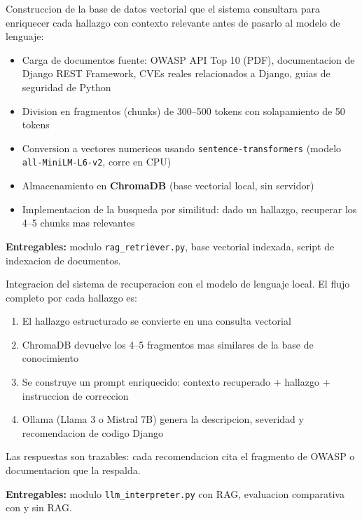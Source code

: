 \documentclass[12pt, a4paper]{article}
\begin{document}
\begin{tealbox}[title={Fase 5 --- Base de conocimiento RAG}]
Construccion de la base de datos vectorial que el sistema consultara para enriquecer cada hallazgo con contexto relevante antes de pasarlo al modelo de lenguaje:

\begin{itemize}[leftmargin=1.5em, itemsep=2pt]
  \item Carga de documentos fuente: OWASP API Top 10 (PDF), documentacion de Django REST Framework, CVEs reales relacionados a Django, guias de seguridad de Python
  \item Division en fragmentos (chunks) de 300--500 tokens con solapamiento de 50 tokens
  \item Conversion a vectores numericos usando \texttt{sentence-transformers} (modelo \texttt{all-MiniLM-L6-v2}, corre en CPU)
  \item Almacenamiento en \textbf{ChromaDB} (base vectorial local, sin servidor)
  \item Implementacion de la busqueda por similitud: dado un hallazgo, recuperar los 4--5 chunks mas relevantes
\end{itemize}

\smallskip
\textbf{Entregables:} modulo \texttt{rag\_retriever.py}, base vectorial indexada, script de indexacion de documentos.
\end{tealbox}

\begin{purplebox}[title={Fase 6 --- Modulo LLM con RAG integrado}]
Integracion del sistema de recuperacion con el modelo de lenguaje local. El flujo completo por cada hallazgo es:

\begin{enumerate}[leftmargin=1.5em, itemsep=2pt]
  \item El hallazgo estructurado se convierte en una consulta vectorial
  \item ChromaDB devuelve los 4--5 fragmentos mas similares de la base de conocimiento
  \item Se construye un prompt enriquecido: contexto recuperado + hallazgo + instruccion de correccion
  \item Ollama (Llama 3 o Mistral 7B) genera la descripcion, severidad y recomendacion de codigo Django
\end{enumerate}

Las respuestas son trazables: cada recomendacion cita el fragmento de OWASP o documentacion que la respalda.

\smallskip
\textbf{Entregables:} modulo \texttt{llm\_interpreter.py} con RAG, evaluacion comparativa con y sin RAG.
\end{purplebox}
\end{document}
